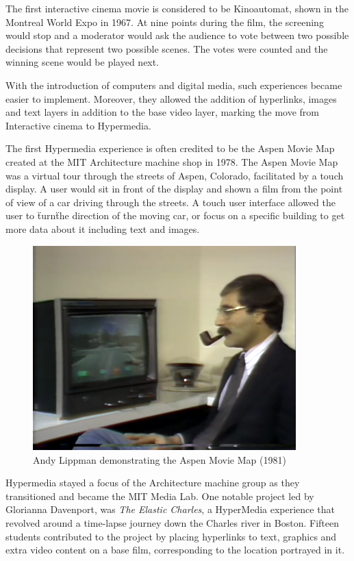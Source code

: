 The first interactive cinema movie is considered to be Kinoautomat\cite{cincera1967kinoautomat}, shown in the Montreal World Expo in 1967. At nine points during the film, the screening would stop and a moderator would ask the audience to vote between two possible decisions that represent two possible scenes. The votes were counted and the winning scene would be played next.    

With the introduction of computers and digital media, such experiences became easier to implement. Moreover, they allowed the addition of hyperlinks, images and text layers in addition to the base video layer, marking the move from Interactive cinema to Hypermedia.  

The first Hypermedia experience is often credited to be the Aspen Movie Map\cite{lippman1978aspen} created at the MIT Architecture machine shop in 1978. The Aspen Movie Map was a virtual tour through the streets of Aspen, Colorado, facilitated by a touch display. A user would sit in front of the display and shown a film from the point of view of a car driving through the streets. A touch user interface allowed the user to \"turn\" the direction of the moving car, or focus on a specific building to get more data about it including text and images. 

   \begin{figure}[thpb]
      \centering
      \includegraphics[width=4in]{figures/aspenmoviemap.png}
      \caption{Andy Lippman demonstrating the Aspen Movie Map (1981)\cite{lippman1978aspen}}
      \label{fig_pier9}
   \end{figure}

Hypermedia stayed a focus of the Architecture machine group as they transitioned and became the MIT Media Lab. One notable project led by Glorianna Davenport, was \textit{The Elastic Charles}\cite{brondmo1990creating}, a HyperMedia experience that revolved around a time-lapse journey down the Charles river in Boston. Fifteen students contributed to the project by placing hyperlinks to text, graphics and extra video content on a base film, corresponding to the location portrayed in it. 

